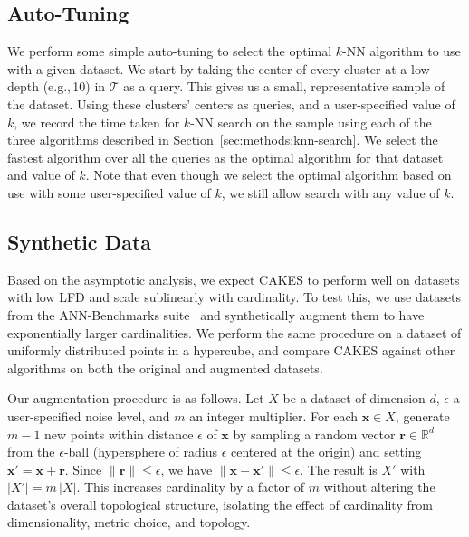 \subsection{Auto-Tuning}
\label{sec:methods:auto-tuning}

We perform some simple auto-tuning to select the optimal $k$-NN algorithm to use with a given dataset.
We start by taking the center of every cluster at a low depth (e.g.,\,10) in $\mathcal{T}$ as a query.
This gives us a small, representative sample of the dataset.
Using these clusters' centers as queries, and a user-specified value of $k$, we record the time taken for $k$-NN search on the sample using each of the three algorithms described in Section~\ref{sec:methods:knn-search}.
We select the fastest algorithm over all the queries as the optimal algorithm for that dataset and value of $k$.
Note that even though we select the optimal algorithm based on use with some user-specified value of $k$, we still allow search with any value of $k$.


\subsection{Synthetic Data}
\label{sec:methods:synthetic-data}

Based on the asymptotic analysis, we expect CAKES to perform well on datasets with low LFD and scale sublinearly with cardinality.
To test this, we use datasets from the ANN-Benchmarks suite~\cite{aumuller2020ann} and synthetically augment them to have exponentially larger cardinalities.
We perform the same procedure on a dataset of uniformly distributed points in a hypercube, and compare CAKES against other algorithms on both the original and augmented datasets.

Our augmentation procedure is as follows.
Let $X$ be a dataset of dimension $d$, $\epsilon$ a user-specified noise level, and $m$ an integer multiplier.
For each $\mathbf{x}\in X$, generate $m-1$ new points within distance $\epsilon$ of $\mathbf{x}$ by sampling a random vector $\mathbf{r}\in\mathbb{R}^d$ from the $\epsilon$-ball (hypersphere of radius $\epsilon$ centered at the origin) and setting $\mathbf{x}'=\mathbf{x}+\mathbf{r}$.
Since $\lVert\mathbf{r}\rVert\le\epsilon$, we have $\lVert\mathbf{x}-\mathbf{x}'\rVert\le\epsilon$.
The result is $X'$ with $\lvert X'\rvert=m\,\lvert X\rvert$.
This increases cardinality by a factor of $m$ without altering the dataset’s overall topological structure, isolating the effect of cardinality from dimensionality, metric choice, and topology.
